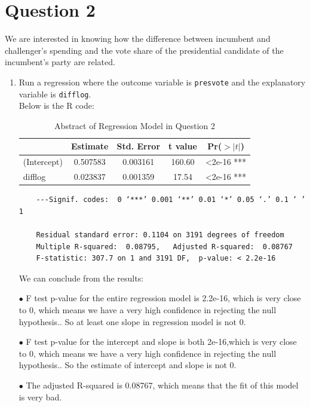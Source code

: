 \documentclass[12pt,letterpaper]{article}
\begin{document}
\section*{Question 2}
\noindent We are interested in knowing how the difference between incumbent and challenger's spending and the vote share of the presidential candidate of the incumbent's party are related.	\vspace{.25cm}
	\begin{enumerate}
			\item Run a regression where the outcome variable is \texttt{presvote} and the explanatory variable is \texttt{difflog}. \\
			
	Below is the R code:
	

	\begin{table}[ht]
		\centering
		\caption{Abstract of Regression Model in Question 2}
		\begin{tabular}{lcccc}
			\toprule
			& Estimate & Std. Error & t value & Pr($>|t|$) \\
			\midrule
			(Intercept) & 0.507583 &0.003161 & 160.60 & <2e-16 *** \\
			difflog & 0.023837 & 0.001359 & 17.54 & <2e-16 *** \\
			\bottomrule
		\end{tabular} 
	\end{table}
	\begin{verbatim}
	---Signif. codes:  0 ‘***’ 0.001 ‘**’ 0.01 ‘*’ 0.05 ‘.’ 0.1 ‘ ’ 1
	
	Residual standard error: 0.1104 on 3191 degrees of freedom
	Multiple R-squared:  0.08795,	Adjusted R-squared:  0.08767 
	F-statistic: 307.7 on 1 and 3191 DF,  p-value: < 2.2e-16
	\end{verbatim}
		We can conclude from the results:
		\item[$\bullet$] F test p-value for the entire regression model is 2.2e-16, which is very close to 0, which means we have a very high confidence in rejecting the null hypothesis.. So at least one slope in regression model is not 0.
		\item[$\bullet$] F test p-value for the intercept and slope is both 2e-16,which is very close to 0, which means we have a very high confidence in rejecting the null hypothesis.. So the estimate of intercept and slope is not 0.
		\item[$\bullet$] The adjusted R-squared is 0.08767, which means that the fit of this model is very bad.
		

\end{enumerate}
\end{document}
